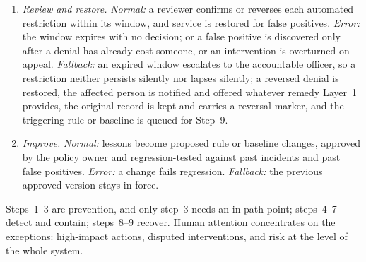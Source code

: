 \documentclass[journal]{IEEEtran}
\begin{document}
\begin{enumerate}
  \textit{Error:} the audit write fails. \textit{Fallback:} the incident stays open and the containment stays in force until the record is complete; no action is reversed on an unrecorded basis.
  \item \textit{Review and restore.} \textit{Normal:} a reviewer confirms or reverses each automated restriction within its window, and service is restored for false positives. \textit{Error:} the window expires with no decision; or a false positive is discovered only after a denial has already cost someone, or an intervention is overturned on appeal. \textit{Fallback:} an expired window escalates to the accountable officer, so a restriction neither persists silently nor lapses silently; a reversed denial is restored, the affected person is notified and offered whatever remedy Layer~1 provides, the original record is kept and carries a reversal marker, and the triggering rule or baseline is queued for Step~9.
  \item \textit{Improve.} \textit{Normal:} lessons become proposed rule or baseline changes, approved by the policy owner and regression-tested against past incidents and past false positives. \textit{Error:} a change fails regression. \textit{Fallback:} the previous approved version stays in force.
\end{enumerate}

Steps~1--3 are prevention, and only step~3 needs an in-path point; steps~4--7 detect and contain; steps~8--9 recover. Human attention concentrates on the exceptions: high-impact actions, disputed interventions, and risk at the level of the whole system.
\end{document}
